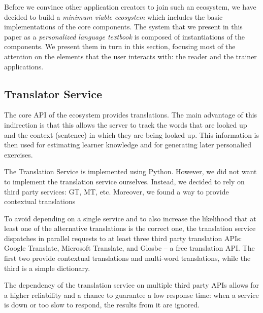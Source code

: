 

Before we convince other application creators to join such an ecosystem, we have decided to build a {\em minimum viable ecosystem} which includes the basic implementations of the core components. The system that we present in this paper as a {\em personalized language textbook} is composed of instantiations of the components. We present them in turn in this section, focusing most of the attention on the elements that the user interacts with: the reader and the trainer applications. 









\subsection{Translator Service}

The core API of the ecosystem provides translations. The main advantage of this indirection is that this allows the server to track the words that are looked up and the context (sentence) in which they are being looked up. This information is then used for estimating learner knowledge and for generating later personalied exercises. 

The Translation Service is implemented using Python. However, we did not want to implement the translation service ourselves. Instead, we decided to rely on third party services: GT, MT, etc. Moreover, we found a way to provide contextual translations 



To avoid depending on a single service and to also increase the likelihood that at least one of the alternative translations is the correct one, the translation service dispatches in parallel requests to at least three third party translation APIs: Google Translate, Microsoft Translate, and Glosbe -- a free translation API. The first two provide contextual translations and multi-word translations, while the third is a simple dictionary. 

The dependency of the translation service on multiple third party APIs allows for a higher reliability and a chance to guarantee a low response time: when a service is down or too slow to respond, the results from it are ignored.

